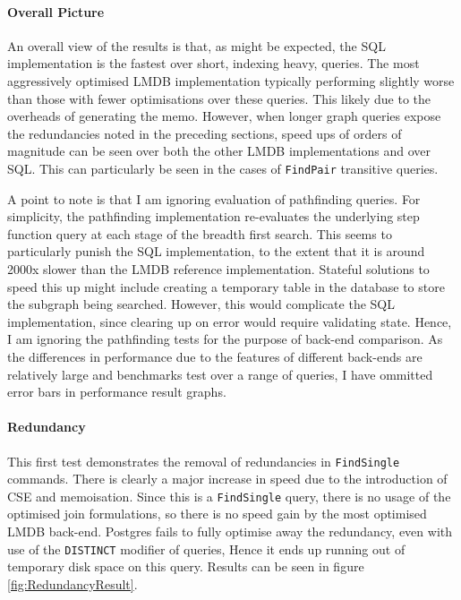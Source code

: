 \documentclass[12pt,a4paper,twoside,openright]{report}
\newcommand\codeName[1]{\texttt{#1}}
\begin{document}
		\paragraph{Overall Picture}
		An overall view of the results is that, as might be expected, the SQL implementation is the fastest over short, indexing heavy, queries. The most aggressively optimised LMDB implementation typically performing slightly worse than those with fewer optimisations over these queries. This likely due to the overheads of generating the memo. However, when longer graph queries expose the redundancies noted in the preceding sections, speed ups of orders of magnitude can be seen over both the other LMDB implementations and over SQL. This can particularly be seen in the cases of \codeName{FindPair} transitive queries.

		A point to note is that I am ignoring evaluation of pathfinding queries. For simplicity, the pathfinding implementation re-evaluates the underlying step function query at each stage of the breadth first search. This seems to particularly punish the SQL implementation, to the extent that it is around 2000x slower than the LMDB reference implementation. Stateful solutions to speed this up might include creating a temporary table in the database to store the subgraph being searched. However, this would complicate the SQL implementation, since clearing up on error would require validating state. Hence, I am ignoring the pathfinding tests for the purpose of back-end comparison.
		As the differences in performance due to the features of different back-ends are relatively large and benchmarks test over a range of queries, I have ommitted error bars in performance result graphs.


\paragraph{Redundancy}
This first test demonstrates the removal of redundancies in \codeName{FindSingle} commands. There is clearly a major increase in speed due to the introduction of CSE and memoisation. Since this is a \codeName{FindSingle} query, there is no usage of the optimised join formulations, so there is no speed gain by the most optimised LMDB back-end. Postgres fails to fully optimise away the redundancy, even with use of the \texttt{DISTINCT} modifier of queries, Hence it ends up running out of temporary disk space on this query. Results can be seen in figure \ref{fig:RedundancyResult}.
				
\end{document}
